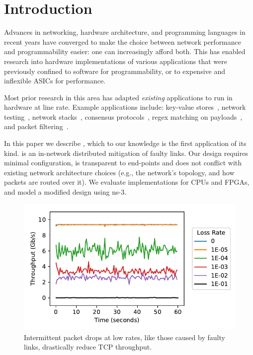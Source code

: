 \section{Introduction}
Advances in networking, hardware architecture, and programming
languages in recent years have converged to make the choice between
network performance and programmability easier: one can increasingly
afford both.
This has enabled research into hardware implementations of various
applications that were previously confined to software for
programmability, or to expensive and inflexible ASICs for performance.

Most prior research in this area has adapted \emph{existing}
applications to run in hardware at line rate.
Example applications include:
key-value stores~\cite{Li:2017:KHI:3132747.3132756},
network testing~\cite{Shahbaz:2013:AOS:2537857.2537880},
network stacks~\cite{Istvan:2016:CBI:2930611.2930639},
consensus protocols~\cite{Istvan:2016:CBI:2930611.2930639},
regex matching on payloads~\cite{Woods:2010:CED:1920841.1920926},
and packet filtering~\cite{Fiessler:2016:HVH:2881025.2881033}.

In this paper we describe \OurSys, which to our knowledge is the first application
of its kind. \OurSys is an in-network distributed
mitigation of faulty links.
Our design requires
minimal configuration, is transparent to
end-points and does not conflict
with existing network architecture choices (e.g., the network's topology,
and how packets are routed over it).
We evaluate implementations for CPUs and FPGAs, and model a modified
design using ns-3.


\begin{figure}
  \centering
  \includegraphics[width=0.3\paperwidth]{figures/timeVsTput.pdf}
  \caption{\label{fig:timeVsTput} Intermittent packet drops at low rates, like those 
  caused by faulty links, drastically reduce TCP throughput.}
\end{figure}



